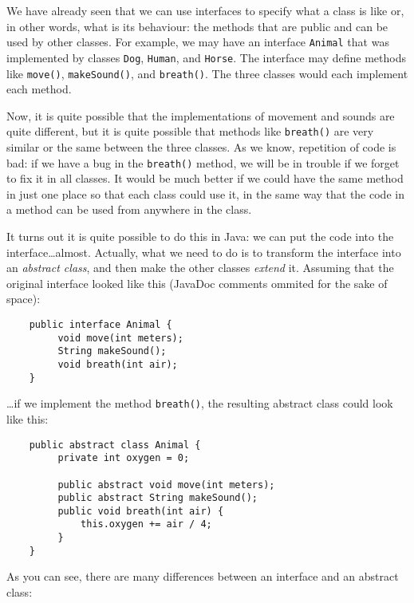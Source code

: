 We have already seen that we can use interfaces to specify what a
class is like or, in other words, what is its behaviour: the methods
that are public and can be used by other classes. For example, we may
have an interface \verb+Animal+ that was implemented by classes
\verb+Dog+, \verb+Human+, and \verb+Horse+. The interface may define
methods like \verb+move()+, \verb+makeSound()+, and
\verb+breath()+. The three classes would each implement each method. 

Now, it is quite possible that the implementations of movement and
sounds are quite different, but it is quite possible that methods like
\verb+breath()+ are very similar or the same between the three
classes. As we know, repetition of code is bad: if we have a bug
in the \verb+breath()+ method, we will be in trouble if we forget to
fix it in all classes. It would be much better if we could have the
same method in just one place so that each class could use it, in the
same way that the code in a method can be used from anywhere in the
class. 

It turns out it is quite possible to do this in Java: we can put the
code into the interface\ldots almost. Actually, what we need to do is
to transform the interface into an \emph{abstract class}, and then
make the other classes \emph{extend} it. Assuming
that the original interface looked like this (JavaDoc comments ommited
for the sake of space):

\begin{verbatim}
    public interface Animal {
         void move(int meters);
         String makeSound();
         void breath(int air);
    }
\end{verbatim}

\ldots if we implement the method \verb+breath()+, the resulting
abstract class could look like this: 

\begin{verbatim}
    public abstract class Animal {
         private int oxygen = 0;

         public abstract void move(int meters);
         public abstract String makeSound();
         public void breath(int air) {
             this.oxygen += air / 4;
         }
    }        
\end{verbatim}

As you can see, there are many differences between an interface and an
abstract class: 

